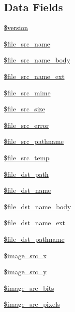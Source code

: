 \subsection*{Data Fields}
\begin{DoxyCompactItemize}
\item 
\hyperlink{classupload_a17c8948c68aa44fa9961ae169b6a8961}{\$version}
\item 
\hyperlink{classupload_a9172f32ea57a456c060efe97aa665962}{\$file\+\_\+src\+\_\+name}
\item 
\hyperlink{classupload_aa095aa1fd4fbdaf963df584545ad3963}{\$file\+\_\+src\+\_\+name\+\_\+body}
\item 
\hyperlink{classupload_aa8a9d41b2c6c66ccfd8183891726e1fd}{\$file\+\_\+src\+\_\+name\+\_\+ext}
\item 
\hyperlink{classupload_abe0747b4ad7aa8c6ae3c6fc120f94224}{\$file\+\_\+src\+\_\+mime}
\item 
\hyperlink{classupload_af1dca7dd97101e95d9cd3c4029b9ac81}{\$file\+\_\+src\+\_\+size}
\item 
\hyperlink{classupload_a1e00e86860c04324694001b083e084ae}{\$file\+\_\+src\+\_\+error}
\item 
\hyperlink{classupload_a088a7d389cf83d36f2827161de2f927d}{\$file\+\_\+src\+\_\+pathname}
\item 
\hyperlink{classupload_ad7c78250c4ba3747f35e37c9c15d6b6a}{\$file\+\_\+src\+\_\+temp}
\item 
\hyperlink{classupload_ada2bb64cba46f0de95956eeb23716ef7}{\$file\+\_\+dst\+\_\+path}
\item 
\hyperlink{classupload_a06a05d37eec7293d81771f6c92b4a048}{\$file\+\_\+dst\+\_\+name}
\item 
\hyperlink{classupload_a5ac6c9818e019cb0f9d94c42c91faf5a}{\$file\+\_\+dst\+\_\+name\+\_\+body}
\item 
\hyperlink{classupload_a5cbef71de1b8c41e2fa1919072c1ac56}{\$file\+\_\+dst\+\_\+name\+\_\+ext}
\item 
\hyperlink{classupload_a68ca7009c428b9b7aea364f66229d38c}{\$file\+\_\+dst\+\_\+pathname}
\item 
\hyperlink{classupload_a7cb8b3d43e15b3ebfffe5dd54ad19276}{\$image\+\_\+src\+\_\+x}
\item 
\hyperlink{classupload_aa872b8a0f21bd4cdeecb7ee9d80e6340}{\$image\+\_\+src\+\_\+y}
\item 
\hyperlink{classupload_a664df9685ccde49dfbb0d417f5048cbe}{\$image\+\_\+src\+\_\+bits}
\item 
\hyperlink{classupload_ae25dbf8fd67dbea1ba09f148342818a5}{\$image\+\_\+src\+\_\+pixels}

\end{DoxyCompactItemize}

